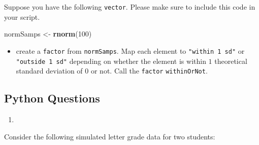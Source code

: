 \documentclass[12pt,krantz2]{krantz}
\makeatletter
\newenvironment{Shaded}{\begin{snugshade}}{\end{snugshade}}
\newcommand{\DecValTok}[1]{\textcolor[rgb]{0.06,0.06,0.06}{#1}}
\newcommand{\KeywordTok}[1]{\textcolor[rgb]{0.27,0.27,0.27}{\textbf{#1}}}
\newcommand{\NormalTok}[1]{#1}
\newcommand{\StringTok}[1]{\textcolor[rgb]{0.5,0.5,0.5}{#1}}
\providecommand{\tightlist}{%
  \setlength{\itemsep}{0pt}\setlength{\parskip}{0pt}}
\newenvironment{kframe}{%
\medskip{}
\setlength{\fboxsep}{.8em}
 \def\at@end@of@kframe{}%
 \ifinner\ifhmode%
  \def\at@end@of@kframe{\end{minipage}}%
  \begin{minipage}{\columnwidth}%
 \fi\fi%
 \def\FrameCommand##1{\hskip\@totalleftmargin \hskip-\fboxsep
 \colorbox{shadecolor}{##1}\hskip-\fboxsep
     \hskip-\linewidth \hskip-\@totalleftmargin \hskip\columnwidth}%
 \MakeFramed {\advance\hsize-\width
   \@totalleftmargin\z@ \linewidth\hsize
   \@setminipage}}%
 {\par\unskip\endMakeFramed%
 \at@end@of@kframe}
\renewenvironment{Shaded}{\begin{kframe}}{\end{kframe}}
\makeatother
\begin{document}
Suppose you have the following \texttt{vector}. Please make sure to include this code in your script.

\begin{Shaded}
\begin{Highlighting}[]
\NormalTok{normSamps <-}\StringTok{ }\KeywordTok{rnorm}\NormalTok{(}\DecValTok{100}\NormalTok{)}
\end{Highlighting}
\end{Shaded}

\begin{itemize}
\tightlist
\item
  create a \texttt{factor} from \texttt{normSamps}. Map each element to \texttt{"within\ 1\ sd"} or \texttt{"outside\ 1\ sd"} depending on whether the element is within \(1\) theoretical standard deviation of \(0\) or not. Call the \texttt{factor} \texttt{withinOrNot}.
\end{itemize}

\hypertarget{python-questions-5}{%
\subsection{Python Questions}\label{python-questions-5}}

\begin{enumerate}
\def\labelenumi{\arabic{enumi}.}
\item
\end{enumerate}

Consider the following simulated letter grade data for two students:
\end{document}
